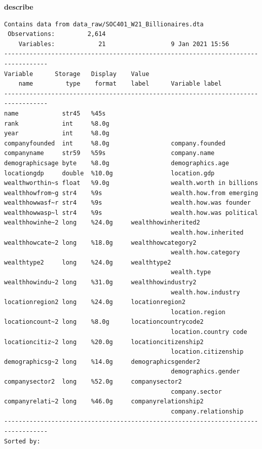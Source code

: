 \documentclass[
]{book}
\newenvironment{Shaded}{\begin{snugshade}}{\end{snugshade}}
\newcommand{\KeywordTok}[1]{\textcolor[rgb]{0.13,0.29,0.53}{\textbf{#1}}}
\begin{document}
\begin{Shaded}
\begin{Highlighting}[]
\KeywordTok{describe}
\end{Highlighting}
\end{Shaded}

\begin{verbatim}
Contains data from data_raw/SOC401_W21_Billionaires.dta
 Observations:         2,614                  
    Variables:            21                  9 Jan 2021 15:56
----------------------------------------------------------------------------------
Variable      Storage   Display    Value
    name         type    format    label      Variable label
----------------------------------------------------------------------------------
name            str45   %45s                  
rank            int     %8.0g                 
year            int     %8.0g                 
companyfounded  int     %8.0g                 company.founded
companyname     str59   %59s                  company.name
demographicsage byte    %8.0g                 demographics.age
locationgdp     double  %10.0g                location.gdp
wealthworthin~s float   %9.0g                 wealth.worth in billions
wealthhowfrom~g str4    %9s                   wealth.how.from emerging
wealthhowwasf~r str4    %9s                   wealth.how.was founder
wealthhowwasp~l str4    %9s                   wealth.how.was political
wealthhowinhe~2 long    %24.0g     wealthhowinherited2
                                              wealth.how.inherited
wealthhowcate~2 long    %18.0g     wealthhowcategory2
                                              wealth.how.category
wealthtype2     long    %24.0g     wealthtype2
                                              wealth.type
wealthhowindu~2 long    %31.0g     wealthhowindustry2
                                              wealth.how.industry
locationregion2 long    %24.0g     locationregion2
                                              location.region
locationcount~2 long    %8.0g      locationcountrycode2
                                              location.country code
locationcitiz~2 long    %20.0g     locationcitizenship2
                                              location.citizenship
demographicsg~2 long    %14.0g     demographicsgender2
                                              demographics.gender
companysector2  long    %52.0g     companysector2
                                              company.sector
companyrelati~2 long    %46.0g     companyrelationship2
                                              company.relationship
----------------------------------------------------------------------------------
Sorted by: 
\end{verbatim}
\end{document}

